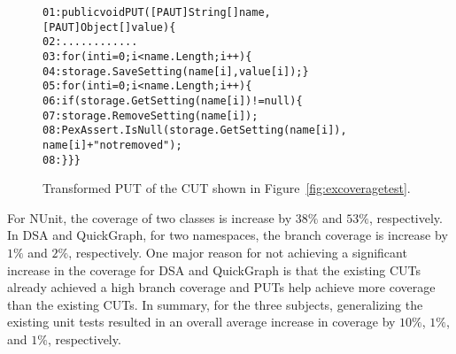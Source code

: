 \begin{figure}[t]
\begin{CodeOut}
\begin{alltt}
01: public void PUT([PAUT]String[] name, 
\hspace*{1.7in}[PAUT]Object[] value) \{
02: \hspace*{0.07in}............
03: \hspace*{0.07in}for (int i = 0; i < name.Length; i++) \{
04: \hspace*{0.22in}storage.SaveSetting(name[i], value[i]); \}
05: \hspace*{0.07in}for (int i = 0; i < name.Length; i++) \{
06: \hspace*{0.17in}if (storage.GetSetting(name[i]) != null) \{
07: \hspace*{0.3in}storage.RemoveSetting(name[i]);
08: \hspace*{0.3in}PexAssert.IsNull(storage.GetSetting(name[i]), 
\hspace*{1.5in}name[i] + " not removed"); 
08: \hspace*{0.1in}\}\}\}
\end{alltt}
\end{CodeOut} \vspace*{-4ex}
\caption{Transformed PUT of the CUT shown in Figure~\ref{fig:excoveragetest}.} \vspace*{-1.5ex}
\label{fig:excoveragePUT}%
\end{figure}

For NUnit, the coverage of two classes is increase by $38\%$ and $53\%$, respectively. In DSA and QuickGraph, for two namespaces, the branch coverage is increase by $1\%$ and $2\%$, respectively. One major reason for not achieving a significant increase in the coverage for DSA and QuickGraph is that the existing CUTs already achieved a high branch coverage and PUTs help achieve more coverage than the existing CUTs. In summary, for the three subjects, generalizing the existing unit tests resulted in an overall average increase in coverage by $10\%$, $1\%$, and $1\%$, respectively. 

